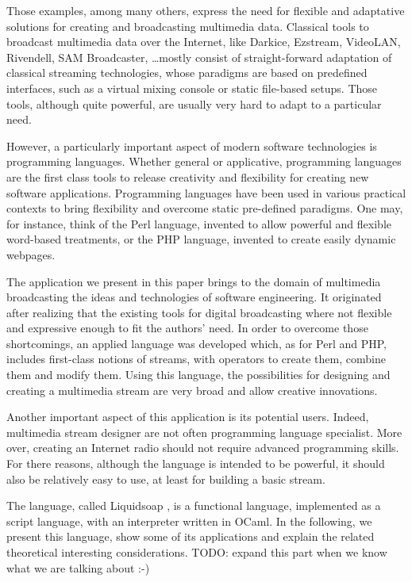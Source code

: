 \documentclass{llncs}
\newcommand{\liquidsoap}{Liquidsoap}
\begin{document}
Those examples, among many others, express the need for flexible
and adaptative solutions for creating and broadcasting multimedia data.
Classical tools to broadcast multimedia data over the Internet, like
Darkice, Ezstream, VideoLAN, Rivendell, SAM Broadcaster, \dots mostly consist 
of straight-forward adaptation of classical streaming technologies, whose 
paradigms are based on predefined interfaces, such as a virtual mixing console
or static file-based setups. Those tools, although quite powerful, are usually very hard 
to adapt to a particular need.

However, a particularly important aspect of modern software technologies is programming
languages. Whether general or applicative, programming languages are the first 
class tools to release creativity and flexibility for creating new software applications.
Programming languages have been used in various practical contexts to bring flexibility
and overcome static pre-defined paradigms. One may, for instance, think of the Perl 
language, invented to allow powerful and flexible word-based treatments, or the PHP
language, invented to create easily dynamic webpages.

The application we present in this paper brings to the domain of multimedia
broadcasting the ideas and technologies of software engineering. It originated 
after realizing that the existing tools for digital broadcasting where not flexible
and expressive enough to fit the authors' need. In order to overcome those shortcomings,
an applied language was developed which, as for Perl and PHP, includes first-class
notions of streams, with operators to create them, combine them and modify them.
Using this language, the possibilities for designing and creating a multimedia stream
are very broad and allow creative innovations.

Another important aspect of this application is its potential users. Indeed,
multimedia stream designer are not often programming language specialist. More
over, creating an Internet radio should not require advanced programming skills.
For there reasons, although the language is intended to be powerful, it should 
also be relatively easy to use, at least for building a basic stream.

The language, called \liquidsoap{} \cite{liquidsoap}, is a functional language, implemented as 
a script language, with an interpreter written in OCaml. In the following,
we present this language, show some of its applications and explain the 
related theoretical interesting considerations.
TODO: expand this part when we know what we are talking about :-)
\end{document}
